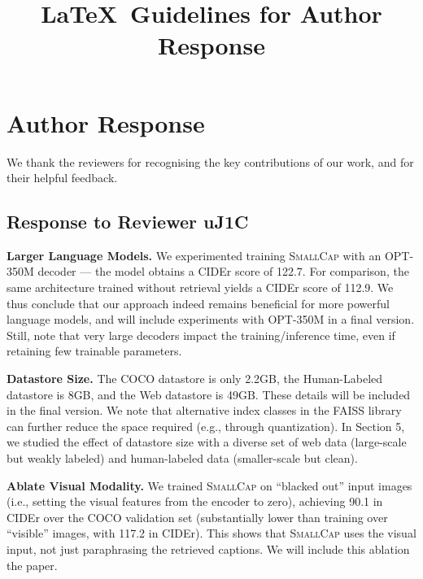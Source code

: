 \documentclass[10pt,twocolumn,letterpaper]{article}
\newcommand{\model}{\textsc{SmallCap}\xspace}
\begin{document}
\title{\LaTeX\ Guidelines for Author Response}  %

\maketitle
\thispagestyle{empty}
\appendix

\section{Author Response}%

We thank the reviewers for recognising the key contributions of our work, and for their helpful feedback. 

\subsection{Response to Reviewer uJ1C}%

\vspace{-0.2cm}

\textbf{Larger Language Models.} We experimented training \model with an OPT-350M decoder --- the model obtains a CIDEr score of 122.7. For comparison, the same architecture trained without retrieval yields a CIDEr score of 112.9. We thus conclude that our approach indeed remains beneficial for more powerful language models, and will include experiments with OPT-350M in a final version. Still, note that very large decoders impact the training/inference time, even if retaining few trainable parameters.

\textbf{Datastore Size.} The COCO datastore is only 2.2GB, the Human-Labeled datastore is 8GB, and the Web datastore is 49GB. These details will be included in the final version. We note that alternative index classes in the FAISS library can further reduce the space required (e.g., through quantization). In Section 5, we studied the effect of datastore size with a diverse set of web data (large-scale but weakly labeled) and human-labeled data (smaller-scale but clean).

\textbf{Ablate Visual Modality.} We trained \model on ``blacked out'' input images (i.e.,  setting the visual features from the encoder to zero), achieving 90.1 in CIDEr over the COCO validation set (substantially lower than training over ``visible'' images, with 117.2 in CIDEr). This shows that \model uses the visual input, not just paraphrasing the retrieved captions. We will include this ablation the paper.
\end{document}
